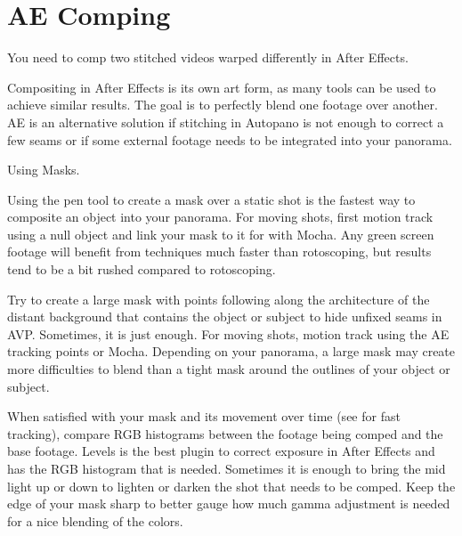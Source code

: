 \chapter{AE Comping}
\pagecolor{white}
\label{chap:51}
\begin{fullwidth}

\problem

{\large You need to comp two stitched videos warped differently in After Effects. \par}

Compositing in After Effects is its own art form, as many tools can be used to achieve similar results. The goal is to perfectly blend one footage over another. AE is an alternative solution if stitching in Autopano is not enough to correct a few seams or if some external footage needs to be integrated into your panorama.

\solution

{\large Using Masks. \par}

Using the pen tool to create a mask over a static shot is the fastest way to composite an object into your panorama. For moving shots, first motion track using a null object and link your mask to it for \textbf{} with Mocha. Any green screen footage will benefit from \textbf{} techniques much faster than rotoscoping, but results tend to be a bit rushed compared to rotoscoping.


Try to create a large mask with points following along the architecture of the distant background that contains the object or subject to hide unfixed seams in AVP. Sometimes, it is just enough. For moving shots, motion track using the AE tracking points or Mocha. Depending on your panorama, a large mask may create more difficulties to blend than a tight mask around the outlines of your object or subject. 


When satisfied with your mask and its movement over time (see \textbf{} for fast tracking), compare RGB histograms between the footage being comped and the base footage. Levels is the best plugin to correct exposure in After Effects and has the RGB histogram that is needed. Sometimes it is enough to bring the mid light up or down to lighten or darken the shot that needs to be comped. Keep the edge of your mask sharp to better gauge how much gamma adjustment is needed for a nice blending of the colors.


\end{fullwidth}
